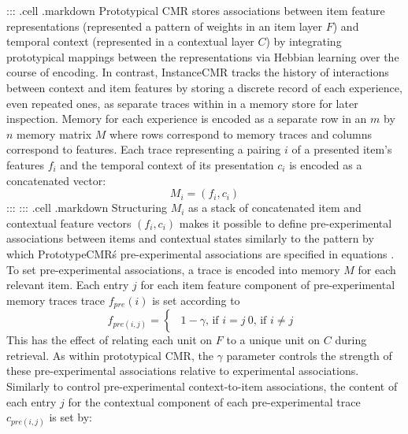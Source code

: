 {}::: {.cell .markdown} Prototypical CMR stores associations between item feature representations (represented a pattern of weights in an item layer $F$) and temporal context (represented in a contextual layer $C$) by integrating prototypical mappings between the representations via Hebbian learning over the course of encoding. In contrast, InstanceCMR tracks the history of interactions between context and item features by storing a discrete record of each experience, even repeated ones, as separate traces within in a memory store for later inspection. Memory for each experience is encoded as a separate row in an $m$ by $n$ memory matrix $M$ where rows correspond to memory traces and columns correspond to features. Each trace representing a pairing $i$ of a presented item's features $f_i$ and the temporal context of its presentation $c_i$ is encoded as a concatenated vector:\markdownRendererInterblockSeparator
{}\begin{equation} \label{eq:14}M_i = (f_i, c_i)\end{equation} :::\markdownRendererInterblockSeparator
{}::: {.cell .markdown}\markdownRendererInterblockSeparator
{}\markdownRendererInterblockSeparator
{}Structuring $M_i$ as a stack of concatenated item and contextual feature vectors $(f_i, c_i)$ makes it possible to define pre-experimental associations between items and contextual states similarly to the pattern by which PrototypeCMR\'s pre-experimental associations are specified in equations . To set pre-experimental associations, a trace is encoded into memory $M$ for each relevant item. Each entry $j$ for each item feature component of pre-experimental memory traces trace $f_{pre}(i)$ is set according to\markdownRendererInterblockSeparator
{}\begin{equation} \label{eq:14} f_{pre(i, j)} = \begin{cases} \begin{alignedat}{2} 1 - \gamma \text{, if } i=j \ 0 \text{, if } i \neq j \end{alignedat} \end{cases} \end{equation}\markdownRendererInterblockSeparator
{}This has the effect of relating each unit on $F$ to a unique unit on $C$ during retrieval. As within prototypical CMR, the $\gamma$ parameter controls the strength of these pre-experimental associations relative to experimental associations.\markdownRendererInterblockSeparator
{}Similarly to control pre-experimental context-to-item associations, the content of each entry $j$ for the contextual component of each pre-experimental trace $c_{pre(i,j)}$ is set by:\markdownRendererInterblockSeparator
